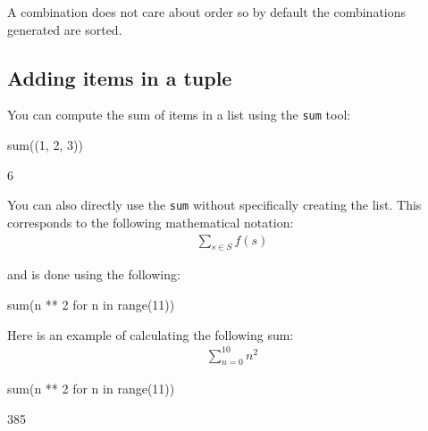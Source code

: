 A combination does not care about order so by default the combinations generated
are sorted.


\subsection{Adding items in a tuple}
\label{\detokenize{tools-for-mathematics/05-combinations-permutations/how/main:adding-items-in-a-tuple}}\label{\detokenize{tools-for-mathematics/05-combinations-permutations/how/main:id5}}

You can compute the sum of items in a list using the \texttt{sum} tool:




\begin{pyin}
sum((1, 2, 3))
\end{pyin}





\begin{raw}
6
\end{raw}





You can also directly use the \texttt{sum} without specifically creating the list. This
corresponds to the following mathematical notation:
\begin{equation*}
\begin{split}
    \sum_{s\in S}f(s)
\end{split}
\end{equation*}

and is done using the following:

\begin{pyin}
sum(n ** 2 for n in range(11))
\end{pyin}


Here is an example of calculating the following sum:
\begin{equation*}
\begin{split}
    \sum_{n=0}^{10} n ^ 2
\end{split}
\end{equation*}



\begin{pyin}
sum(n ** 2 for n in range(11))
\end{pyin}





\begin{raw}
385
\end{raw}





